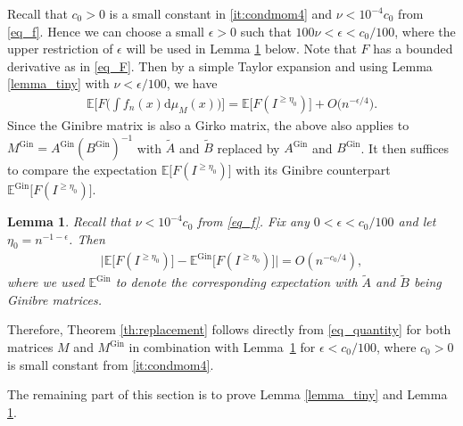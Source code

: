 \documentclass[10pt,reqno]{amsart}
\newcommand{\A}{{\tilde{A}}}
\newcommand{\B}{{\tilde{B}}}
\newcommand{\II}{I^{\geq \eta_0}} %
\newcommand{\dd}{\mathrm{d}}
\newcommand{\<}{\langle}
\renewcommand{\>}{\rangle}
\newcommand{\G}{\mathrm{Gin}}
\newcommand{\AG}{A^{\mathrm{Gin}}}
\newcommand{\BG}{B^{\mathrm{Gin}}}
\newcommand{\MG}{M^{\mathrm{Gin}}}
\numberwithin{equation}{section}
\newtheorem{lemma}[theorem]{Lemma}%
\begin{document}
Recall that $c_0>0$ is a small constant in \ref{it:condmom4} and $\nu<10^{-4}c_0$ from \eqref{eq_f}. Hence we can choose a small $\epsilon>0$ such that $100\nu<\epsilon<c_0/100$, where the upper restriction of $\epsilon$ will be used in Lemma \ref{lemma_GFT} below. Note that $F$ has a bounded derivative as in \eqref{eq_F}. Then by a simple Taylor expansion and using Lemma \ref{lemma_tiny}  with $\nu<\epsilon/100$, we have
\begin{align}\label{eq_quantity}
	\mathbb{E} \Big[ F \Big(  \int f_n(x)\dd\mu_M(x)\Big) \Big]=\mathbb{E} \big[ F (\II) \big]+O\big( n^{-\epsilon/4}\big).
\end{align}
Since the Ginibre matrix is also a Girko matrix, the above also applies to $\MG=\AG(\BG)^{-1}$ with $\A$ and $\B$ replaced by $\AG$ and $\BG$. 
It then suffices to compare the expectation $\mathbb{E}\big[ F (\II) \big]$ with its Ginibre counterpart $\mathbb{E}^{\G}\big[ F (\II) \big]$.
\begin{lemma}\label{lemma_GFT}
Recall that $\nu<10^{-4}c_0$ from \eqref{eq_f}.	Fix any $0<\epsilon<c_0/100$ and let $\eta_0=n^{-1-\epsilon}$.  Then 
	\begin{align}
    \label{eq_GFT}
		\Big|\mathbb{E} \big[ F (\II) \big] -\mathbb{E}^{\mathrm{Gin}}  \big[ F (\II) \big] \Big|=O(n^{-c_0/4}),
	\end{align}
where we used $\mathbb{E}^{\mathrm{Gin}} $ to denote the corresponding expectation with $\A$ and $\B$ being Ginibre matrices. 
\end{lemma}


 Therefore, Theorem \ref{th:replacement} follows directly from \eqref{eq_quantity} for both matrices $M$ and $\MG$ in combination with Lemma~\ref{lemma_GFT} for $\epsilon<c_0/100$, where $c_0>0$ is small constant from \ref{it:condmom4}.
 
 \medskip
 
 The remaining part of this section is to prove Lemma \ref{lemma_tiny} and Lemma \ref{lemma_GFT}.
 
\end{document}

